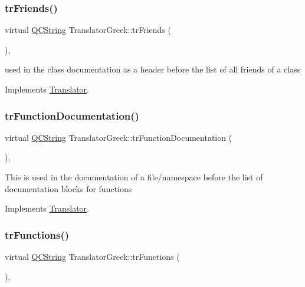 \subsubsection{\texorpdfstring{trFriends()}{trFriends()}}
{\footnotesize\ttfamily virtual \mbox{\hyperlink{class_q_c_string}{Q\+C\+String}} Translator\+Greek\+::tr\+Friends (\begin{DoxyParamCaption}{ }\end{DoxyParamCaption})\hspace{0.3cm}{\ttfamily [inline]}, {\ttfamily [virtual]}}

used in the class documentation as a header before the list of all friends of a class 

Implements \mbox{\hyperlink{class_translator}{Translator}}.

\mbox{\label{class_translator_greek_a02e6675a5b8fb7c0362a9c874eed394b}} 
\subsubsection{\texorpdfstring{trFunctionDocumentation()}{trFunctionDocumentation()}}
{\footnotesize\ttfamily virtual \mbox{\hyperlink{class_q_c_string}{Q\+C\+String}} Translator\+Greek\+::tr\+Function\+Documentation (\begin{DoxyParamCaption}{ }\end{DoxyParamCaption})\hspace{0.3cm}{\ttfamily [inline]}, {\ttfamily [virtual]}}

This is used in the documentation of a file/namespace before the list of documentation blocks for functions 

Implements \mbox{\hyperlink{class_translator}{Translator}}.

\mbox{\label{class_translator_greek_a3174185269432d1d4de032e309da3dd1}} 
\subsubsection{\texorpdfstring{trFunctions()}{trFunctions()}}
{\footnotesize\ttfamily virtual \mbox{\hyperlink{class_q_c_string}{Q\+C\+String}} Translator\+Greek\+::tr\+Functions (\begin{DoxyParamCaption}{ }\end{DoxyParamCaption})\hspace{0.3cm}{\ttfamily [inline]}, {\ttfamily [virtual]}}

